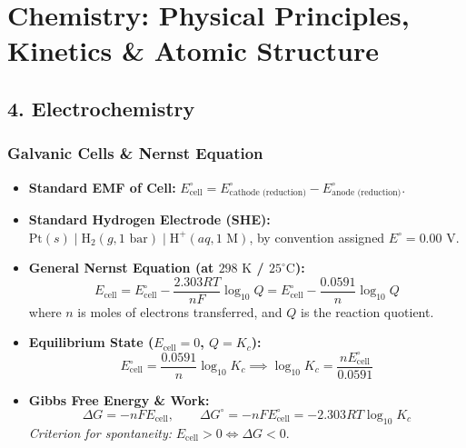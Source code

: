 \documentclass[11pt,a4paper]{article}
\begin{document}
\section{Chemistry: Physical Principles, Kinetics \& Atomic Structure}

\subsection{4. Electrochemistry}

\subsubsection{Galvanic Cells \& Nernst Equation}
\begin{itemize}[leftmargin=1.5em, itemsep=2pt]
  \item \textbf{Standard EMF of Cell:} $E^\circ_{\text{cell}} = E^\circ_{\text{cathode (reduction)}} - E^\circ_{\text{anode (reduction)}}$.
  \item \textbf{Standard Hydrogen Electrode (SHE):} $\text{Pt}(s) \mid \text{H}_2(g, 1\text{ bar}) \mid \text{H}^+(aq, 1\text{ M})$, by convention assigned $E^\circ = 0.00\text{ V}$.
  \item \textbf{General Nernst Equation (at $298\text{ K}$ / $25^\circ\text{C}$):}
  \[
    E_{\text{cell}} = E^\circ_{\text{cell}} - \frac{2.303 RT}{n F} \log_{10} Q = E^\circ_{\text{cell}} - \frac{0.0591}{n} \log_{10} Q
  \]
  where $n$ is moles of electrons transferred, and $Q$ is the reaction quotient.
  \item \textbf{Equilibrium State ($E_{\text{cell}} = 0$, $Q = K_c$):}
  \[
    E^\circ_{\text{cell}} = \frac{0.0591}{n} \log_{10} K_c \implies \log_{10} K_c = \frac{n E^\circ_{\text{cell}}}{0.0591}
  \]
  \item \textbf{Gibbs Free Energy \& Work:}
  \[
    \Delta G = -n F E_{\text{cell}}, \qquad \Delta G^\circ = -n F E^\circ_{\text{cell}} = -2.303 RT \log_{10} K_c
  \]
  \textit{Criterion for spontaneity:} $E_{\text{cell}} > 0 \iff \Delta G < 0$.
\end{itemize}
\end{document}
